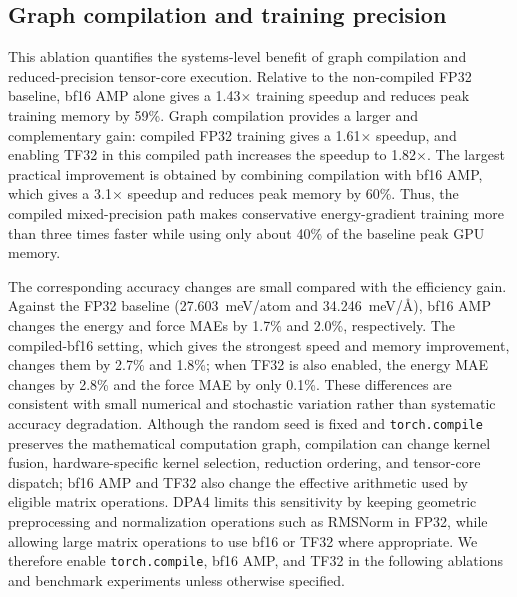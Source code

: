 \subsection{Graph compilation and training precision}
\label{sec:sm-compile-ablation}

This ablation quantifies the systems-level benefit of graph compilation and
reduced-precision tensor-core execution. Relative to the non-compiled FP32
baseline, bf16 AMP alone gives a 1.43$\times$ training speedup and reduces peak
training memory by 59\%. Graph compilation provides a larger and complementary
gain: compiled FP32 training gives a 1.61$\times$ speedup, and enabling TF32 in
this compiled path increases the speedup to 1.82$\times$. The largest practical
improvement is obtained by combining compilation with bf16 AMP, which gives a
3.1$\times$ speedup and reduces peak memory by 60\%. Thus, the compiled
mixed-precision path makes conservative energy-gradient training more than three times
faster while using only about 40\% of the baseline peak GPU memory.

The corresponding accuracy changes are small compared with the efficiency gain.
Against the FP32 baseline (27.603~meV/atom and 34.246~meV/\AA{}), bf16 AMP
changes the energy and force MAEs by 1.7\% and 2.0\%, respectively. The
compiled-bf16 setting, which gives the strongest speed and memory improvement,
changes them by 2.7\% and 1.8\%; when TF32 is also enabled, the energy MAE
changes by 2.8\% and the force MAE by only 0.1\%. These differences are
consistent with small numerical and stochastic variation rather than systematic
accuracy degradation. Although the random seed is fixed and
\texttt{torch.compile} preserves the mathematical computation graph,
compilation can change kernel fusion, hardware-specific kernel selection,
reduction ordering, and tensor-core dispatch; bf16 AMP and TF32 also change the
effective arithmetic used by eligible matrix operations. DPA4 limits this
sensitivity by keeping geometric preprocessing and normalization operations
such as RMSNorm in FP32, while allowing large matrix operations to use bf16 or
TF32 where appropriate. We therefore enable \texttt{torch.compile}, bf16 AMP,
and TF32 in the following ablations and benchmark experiments unless otherwise
specified.


